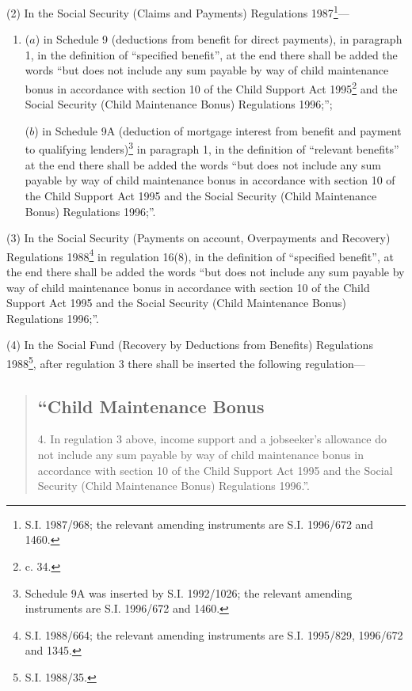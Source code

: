 \documentclass[12pt,a4paper]{article}
\begin{document}
(2) In the Social Security (Claims and Payments) Regulations 1987\footnote{\frenchspacing S.I. 1987/968; the relevant amending instruments are S.I. 1996/672 and 1460.}—
\begin{enumerate}\item[]
($a$) in Schedule 9 (deductions from benefit for direct payments), in paragraph 1, in the definition of “specified benefit”, at the end there shall be added the words “but does not include any sum payable by way of child maintenance bonus in accordance with section 10 of the Child Support Act 1995\footnote{ c. 34.} and the 
Social Security (Child Maintenance Bonus)  %
Regulations 1996;”;

($b$) in Schedule 9A (deduction of mortgage interest from benefit and payment to qualifying lenders)\footnote{\frenchspacing Schedule 9A was inserted by S.I. 1992/1026; the relevant amending instruments are S.I. 1996/672 and 1460.} in paragraph 1, in the definition of “relevant benefits” at the end there shall be added the words “but does not include any sum payable by way of child maintenance bonus in accordance with section 10 of the Child Support Act 1995 and the 
Social Security (Child Maintenance Bonus)  %
Regulations 1996;”.
\end{enumerate}

(3) In the Social Security (Payments on account, Overpayments and Recovery) Regulations 1988\footnote{\frenchspacing S.I. 1988/664; the relevant amending instruments are S.I. 1995/829, 1996/672 and 1345.} in regulation 16(8), in the definition of “specified benefit”, at the end there shall be added the words “but does not include any sum payable by way of child maintenance bonus in accordance with section 10 of the Child Support Act 1995 and the 
Social Security (Child Maintenance Bonus)  %
Regulations 1996;”.

(4) In the Social Fund (Recovery by Deductions from Benefits) Regulations 1988\footnote{\frenchspacing S.I. 1988/35.}, after regulation 3 there shall be inserted the following regulation—
\begin{quotation}
\subsection*{“Child Maintenance Bonus}

4.  In regulation 3 above, income support and a jobseeker’s allowance do not include any sum payable by way of child maintenance bonus in accordance with section 10 of the Child Support Act 1995 and the 
Social Security (Child Maintenance Bonus)  %
Regulations 1996.”.
\end{quotation}
\end{document}
